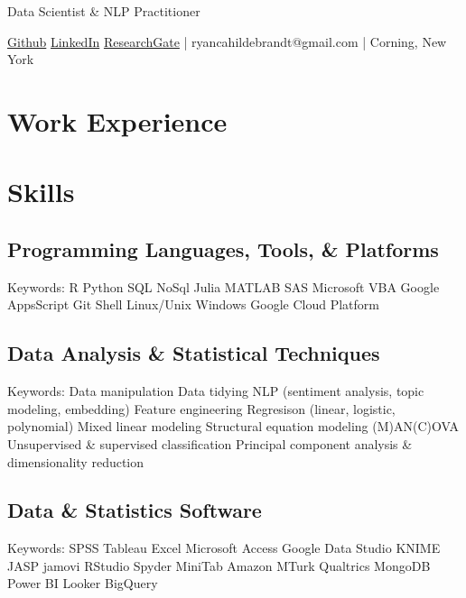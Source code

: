 \documentclass[letterpaper]{deedy-resume_sm}
\begin{document}
\lastupdated %

\leavevmode

\sectionspace
\leavevmode
Data Scientist \& NLP Practitioner
\leavevmode

\href{https://github.com/ryancahildebrandt}{Github}
\href{https://linkedin.com/in/rcah}{LinkedIn}
\href{https://researchgate.net/profile/Ryan-Hildebrandt}{ResearchGate}
 | ryancahildebrandt@gmail.com | Corning, New York

\sectionspace

\section{Work Experience}

\section{Skills}
\subsection{Programming Languages, Tools, \& Platforms}
Keywords: R \textbullet{} Python \textbullet{} SQL \textbullet{} NoSql \textbullet{} Julia \textbullet{} MATLAB \textbullet{} SAS \textbullet{} Microsoft VBA \textbullet{} Google AppsScript \textbullet{} Git \textbullet{} Shell \textbullet{} Linux/Unix \textbullet{} Windows \textbullet{} Google Cloud Platform

\subsection{Data Analysis \& Statistical Techniques}
Keywords: Data manipulation \textbullet{} Data tidying \textbullet{} NLP (sentiment analysis, topic modeling, embedding) \textbullet{} Feature engineering \textbullet{} Regresison (linear, logistic, polynomial) \textbullet{} Mixed linear modeling \textbullet{} Structural equation modeling \textbullet{} (M)AN(C)OVA \textbullet{} Unsupervised \& supervised classification \textbullet{} Principal component analysis \& dimensionality reduction

\subsection{Data \& Statistics Software}
Keywords: SPSS \textbullet{} Tableau \textbullet{} Excel \textbullet{} Microsoft Access \textbullet{} Google Data Studio \textbullet{} KNIME \textbullet{} JASP \textbullet{} jamovi \textbullet{} RStudio \textbullet{} Spyder \textbullet{} MiniTab \textbullet{} Amazon MTurk \textbullet{} Qualtrics \textbullet{} MongoDB \textbullet{} Power BI \textbullet{} Looker \textbullet{} BigQuery
\end{document}
